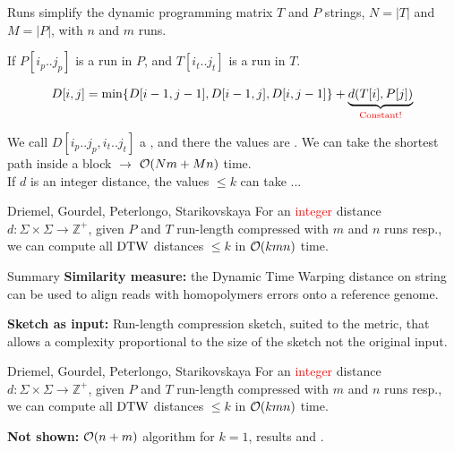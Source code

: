 \begin{frame}{Runs simplify the dynamic programming matrix}
    $T$ and $P$ strings, $N=|T|$ and $M=|P|$, with $n$ and $m$ runs. \pause
    \smallskip

    If $P[i_p.. j_p]$ is a run in $P$, and $T[i_t .. j_t]$ is a run in $T$.\pause
    
    
    {
    \[
        D[i,j] = {\min\{D[i-1,j-1],D[i-1,j],D[i,j-1]\}
        + \underbrace{d(T[i], P[j])}_\text{\textcolor{red}{Constant!}}}
    \]
    }

    \pause       
    We call $D[i_p .. j_p, i_t .. j_t]$ a , and there the values are .\pause
    We can take the shortest path inside a block $\rightarrow$ $\mathcal{O}(Nm+Mn)$ time.\\ \pause
    If $d$ is an integer distance, the values $\leq k$ can take ... \pause
    
    \begin{myalertblock}{Driemel, Gourdel, Peterlongo, Starikovskaya}
        For an \textcolor{red}{integer} distance $d: \Sigma \times \Sigma \rightarrow \mathbb{Z}^+$, given $P$ and $T$ run-length compressed with $m$ and $n$ runs resp.,
        we can compute all $\mathrm{DTW}$ distances $\leq k$ in $\mathcal{O}(k mn)$ time.
    \end{myalertblock}
    \end{frame}

\begin{frame}{Summary}
    \textbf{Similarity measure:} the Dynamic Time Warping distance on string can be used to align reads with homopolymers errors onto a reference genome.

    \vfill
    
    \textbf{Sketch as input:} Run-length compression sketch, suited to the metric, that allows a complexity proportional to the size of the sketch not the original input.
    
    \vfill
    \begin{myalertblock}{Driemel, Gourdel, Peterlongo, Starikovskaya}
        For an \textcolor{red}{integer} distance $d: \Sigma \times \Sigma \rightarrow \mathbb{Z}^+$, given $P$ and $T$ run-length compressed with $m$ and $n$ runs resp.,
        we can compute all $\mathrm{DTW}$ distances $\leq k$ in $\mathcal{O}(k mn)$ time.
    \end{myalertblock}
    \vfill
    \textbf{Not shown:} $\mathcal{O}(n+m)$ algorithm for $k=1$,   results and .
\end{frame}
    